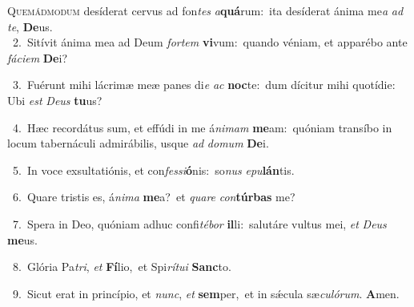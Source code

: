 \lettrine{\initial\textcolor{\initialcolor}{Q}}{uemádmodum} desíderat cervus ad fon\textit{tes} \textit{a}\-\textbf{quá}rum:~\star ita desíderat ánima me\textit{a} \textit{ad} \textit{te}\-, \textbf{De}\-us.\\
{\numbfont\textcolor{\numbcolor}{~2.}}~Sitívit ánima mea ad Deum \textit{for}\-\textit{tem} \textbf{vi}\-vum:~\star quando véniam, et apparébo ante \textit{fá}\-\textit{ci}\textit{em} \textbf{De}\-i?\par
{\numbfont\textcolor{\numbcolor}{~3.}}~Fuérunt mihi lácrimæ meæ panes di\textit{e} \textit{ac} \textbf{noc}\-te:~\star dum dícitur mihi quotídie: Ubi \textit{est} \textit{De}\-\textit{us} \textbf{tu}\-us?\par
{\numbfont\textcolor{\numbcolor}{~4.}}~Hæc recordátus sum, et effúdi in me á\-\textit{ni}\-\textit{mam} \textbf{me}\-am:~\star quóniam transíbo in locum tabernáculi admirábilis, usque \textit{ad} \textit{do}\-\textit{mum} \textbf{De}\-i.\par
{\numbfont\textcolor{\numbcolor}{~5.}}~In voce exsultatiónis, et con\-\textit{fes}\-\textit{si}\textbf{ó}nis:~\star so\textit{nus} \textit{e}\-\textit{pu}\textbf{lán}tis.\par
{\numbfont\textcolor{\numbcolor}{~6.}}~Quare tristis es, á\-\textit{ni}\-\textit{ma} \textbf{me}\-a?~\star et \textit{qua}\-\textit{re} \textit{con}\-\textbf{túr}\textbf{bas} me?\par
{\numbfont\textcolor{\numbcolor}{~7.}}~Spera in Deo, quóniam adhuc confi\-\textit{té}\-\textit{bor} \textbf{il}\-li:~\star salutáre vultus mei, \textit{et} \textit{De}\-\textit{us} \textbf{me}\-us.\par
{\numbfont\textcolor{\numbcolor}{~8.}}~Glória Pa\-\textit{tri}\-, \textit{et} \textbf{Fí}\-lio,~\star et Spi\-\textit{rí}\-\textit{tu}\textit{i} \textbf{Sanc}\-to.\par
{\numbfont\textcolor{\numbcolor}{~9.}}~Sicut erat in princípio, et \textit{nunc}\-, \textit{et} \textbf{sem}\-per,~\star et in sǽcula sæ\-\textit{cu}\-\textit{ló}\textit{rum}. \textbf{A}\-men.\par
